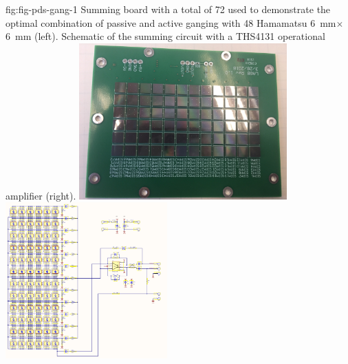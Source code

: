 \begin{dunefigure}
 {fig:fig-pds-gang-1}
 {Summing board with a total of 72  used to demonstrate the optimal combination of passive and active ganging with 48 Hamamatsu \SI{6}{mm}$\times$\SI{6}{mm}  (left).  Schematic of the summing circuit with a THS4131 operational amplifier (right).}
\includegraphics[height=6cm]{graphics/pds_gang_fig1.jpg}
\includegraphics[height=6cm]{graphics/pds_gang_fig2.png}
\end{dunefigure}



